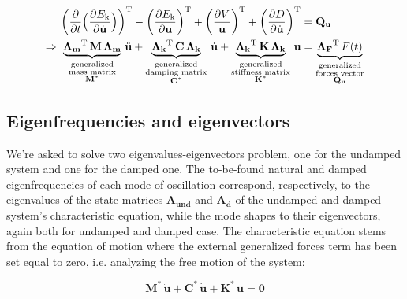 \documentclass[a4paper,12pt,oneside]{article}
\begin{document}
\begin{align}
\label{eqn:motion}
	\biggl(\frac{\partial}{\partial t}
		\Bigl(\frac{\partial E_\textup{k}}
		{\partial \dot{\mathbf{u}}}\Bigr)\biggr)^\textup{T} -
		\biggl(\frac{\partial E_\textup{k}}{\partial \mathbf{u}}\biggr)^\textup{T} +
		\biggl(\frac{\partial V}{\mathbf{u}}\biggr)^\textup{T} +
		\biggl(\frac{\partial D}{\partial \dot{\mathbf{u}}}\biggr)^\textup{T} & =
		\mathbf{Q_u} \notag \\
	\Rightarrow ~
		\underbrace{\mathbf{\Lambda_m}^\textup{T} \, \mathbf{M} \, \mathbf{\Lambda_m}}_
		{\substack{\text{generalized} \\ \text{mass matrix} \\
		\text{$ \mathbf{M^*} $}}} \, \ddot{\mathbf{u}} +
		\underbrace{\mathbf{\Lambda_k}^\textup{T} \, \mathbf{C} \,	\mathbf{\Lambda_k}}_
		{\substack{\text{generalized} \\ \text{damping matrix} \\
		\text{$ \mathbf{C^*} $}}} \, \dot{\mathbf{u}} +
		\underbrace{\mathbf{\Lambda_k}^\textup{T} \, \mathbf{K} \, \mathbf{\Lambda_k}}_
		{\substack{\text{generalized} \\ \text{stiffness matrix} \\
		\text{$ \mathbf{K^*} $}}} \, \mathbf{u} & =
		\underbrace{\mathbf{\Lambda_F}^\textup{T} \, F(t)}_
		{\substack{\text{generalized} \\ \text{forces vector} \\
		\text{$ \mathbf{Q_u} $}}}
\end{align}

\subsection{Eigenfrequencies and eigenvectors}

We're asked to solve two eigenvalues-eigenvectors problem, one for the undamped system and one for the damped one. The to-be-found natural and damped eigenfrequencies of each mode of oscillation correspond, respectively, to the eigenvalues of the state matrices $ \mathbf{A_{und}} $ and $ \mathbf{A_d} $ of the undamped and damped system's characteristic equation, while the mode shapes to their eigenvectors, again both for undamped and damped case. The characteristic equation stems from the equation of motion where the external generalized forces term has been set equal to zero, i.e. analyzing the free motion of the system:

\[
	\mathbf{M^*} \, \ddot{\mathbf{u}} + \mathbf{C^*} \, \dot{\mathbf{u}} +
		\mathbf{K^*} \, \mathbf{u} = \mathbf{0}
\]
\end{document}
